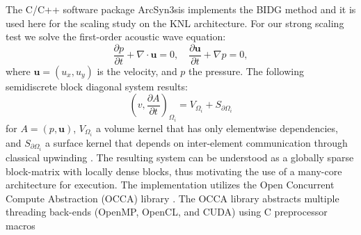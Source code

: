 The C/C++ software package ArcSyn3sis implements the BIDG method and it is used here
for the scaling study on the KNL architecture. For our strong scaling test we solve the first-order acoustic wave equation:
\begin{equation}
  \label{awe}
  \frac{\partial p}{\partial t} + \nabla\cdot \boldsymbol{u} = 0, \quad
  \frac{\partial\boldsymbol{u}}{\partial t} + \nabla p = 0,
\end{equation}
where $\boldsymbol{u}=(u_x,u_y)$ is the velocity, and $p$ the pressure. The following semidiscrete block diagonal system results:
\[
  \left( v, \frac{ \partial A}{\partial t} \right)_{\Omega_{i}} =
  V_{\Omega_{i}}+S_{\partial\Omega_{i}}
\]
for $A = (p,\boldsymbol{u})$, $V_{\Omega_{i}}$ a volume kernel that has only
elementwise dependencies, and $S_{\partial\Omega_{i}}$ a surface kernel that
depends on inter-element communication through classical upwinding
\cite{Michoski2014898}.  The resulting system can be understood as a globally sparse block-matrix with locally dense blocks, thus motivating the use of a many-core architecture for execution.  The implementation utilizes the Open Concurrent Compute Abstraction (OCCA) library \cite{MedinaPress}. The OCCA library abstracts multiple threading back-ends (OpenMP, OpenCL, and CUDA) using C preprocessor macros



